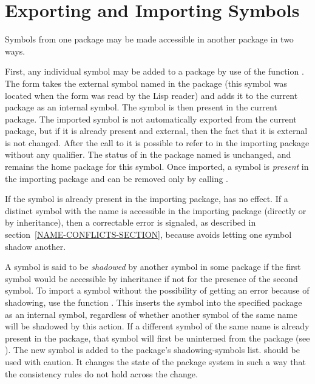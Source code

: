 \section{Exporting and Importing Symbols}
\label{EXPORT-IMPORT-SECTION}

Symbols from one package may be made accessible in another package in
two ways.

First, any individual symbol may be added to a package by use
of the function .  The form  takes
the external symbol named  in the  package (this
symbol was located when the form was read by the Lisp reader) and adds
it to the current package as an internal symbol.  The symbol is then
present in the current package.  The imported symbol is
not automatically exported from the current package, but if it is
already present and external, then the fact that it
is external is not changed.  After the call to
 it is possible to refer to  in the importing package
without any qualifier.  The status of  in the package named
 is unchanged, and  remains the home package for
this symbol.  Once imported, a symbol is {\it present} in the
importing package and can be removed only by calling .

If the symbol is already present in the importing package, 
has no effect.  If a distinct symbol with the name  is
accessible in the importing package (directly or by inheritance), then a
correctable error is signaled, as described in
section~\ref{NAME-CONFLICTS-SECTION}, because  avoids letting
one symbol shadow another.

A symbol is said to be {\it shadowed} by another symbol in
some package if the first symbol would be accessible by inheritance
if not for the presence of the second symbol.
To import a symbol without the possibility
of getting an
error because of shadowing,
use the function .  This inserts
the symbol into the specified package as an internal symbol, regardless
of whether another symbol of the same name will be shadowed by this
action.
If a different symbol of the same name is already present
in the package, that symbol will first be uninterned from the package
(see ).  The new symbol is
added to the package's shadowing-symbols list.  
should be used with caution.  It changes the state of the package system
in such a way that the consistency rules do not hold across the change.

